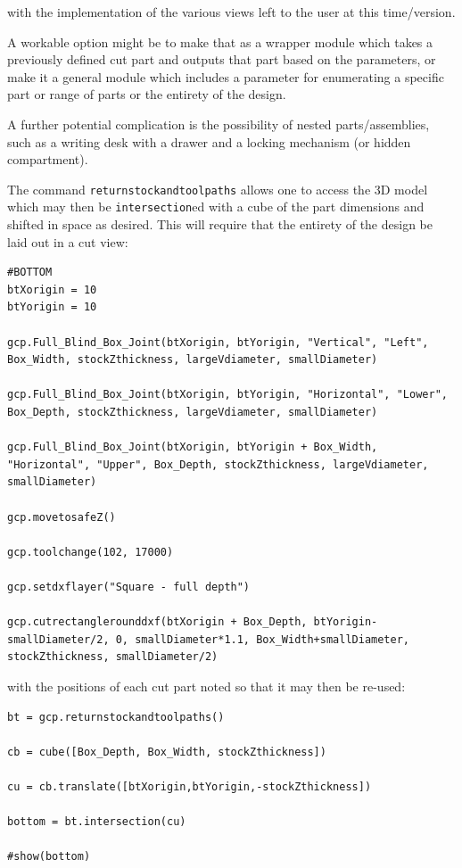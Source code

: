 \documentclass{ltxdoc}
\begin{document}
\noindent with the implementation of the various views left to the user at this time/version.

A workable option might be to make that as a wrapper module which takes a previously defined cut part and outputs that part based on the parameters, or make it a general module which includes a parameter for enumerating a specific part or range of parts or the entirety of the design.

A further potential complication is the possibility of nested parts/assemblies, such as a writing desk with a drawer and a locking mechanism (or hidden compartment).

The command \verb|returnstockandtoolpaths| allows one to access the 3D model which may then be \verb|intersection|ed with a cube of the part dimensions and shifted in space as desired. This will require that the entirety of the design be laid out in a cut view:

\begin{verbatim}
#BOTTOM
btXorigin = 10
btYorigin = 10

gcp.Full_Blind_Box_Joint(btXorigin, btYorigin, "Vertical", "Left", Box_Width, stockZthickness, largeVdiameter, smallDiameter)

gcp.Full_Blind_Box_Joint(btXorigin, btYorigin, "Horizontal", "Lower", Box_Depth, stockZthickness, largeVdiameter, smallDiameter)

gcp.Full_Blind_Box_Joint(btXorigin, btYorigin + Box_Width, "Horizontal", "Upper", Box_Depth, stockZthickness, largeVdiameter, smallDiameter)

gcp.movetosafeZ()

gcp.toolchange(102, 17000)

gcp.setdxflayer("Square - full depth")

gcp.cutrectanglerounddxf(btXorigin + Box_Depth, btYorigin-smallDiameter/2, 0, smallDiameter*1.1, Box_Width+smallDiameter, stockZthickness, smallDiameter/2)
\end{verbatim}

\noindent with the positions of each cut part noted so that it may then be re-used:

\begin{verbatim}
bt = gcp.returnstockandtoolpaths()

cb = cube([Box_Depth, Box_Width, stockZthickness])

cu = cb.translate([btXorigin,btYorigin,-stockZthickness])

bottom = bt.intersection(cu)

#show(bottom)
\end{verbatim}
\end{document}

